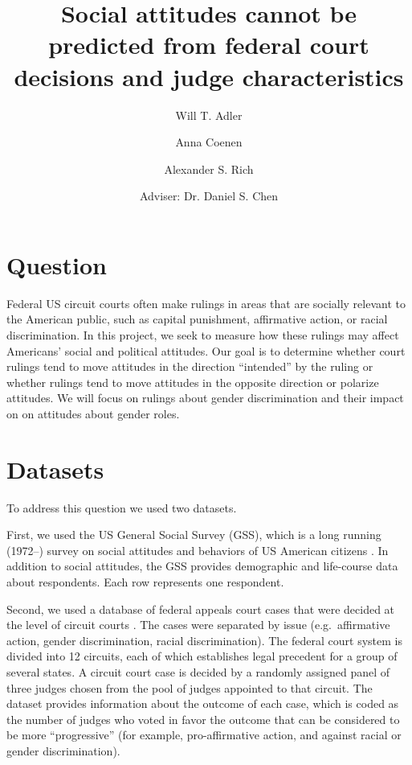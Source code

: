 \documentclass{article}
\begin{document}
\title{Social attitudes cannot be predicted from federal court decisions and
judge characteristics}


\author[ ]{Will T. Adler}
\author[ ]{Anna Coenen}
\author[ ]{Alexander S. Rich}
\author[ ]{Adviser: Dr. Daniel S. Chen}


\affil[ ]{}
\vspace{-1em}


\date{}


\begingroup
\let\center\flushleft
\let\endcenter\endflushleft
\maketitle
\endgroup




\section{Question}\label{question}

Federal US circuit courts often make rulings in areas that are socially
relevant to the American public, such as capital punishment, affirmative
action, or racial discrimination. In this project, we seek to measure
how these rulings may affect Americans' social and political attitudes.
Our goal is to determine whether court rulings tend to move attitudes in
the direction ``intended'' by the ruling or whether rulings tend to move
attitudes in the opposite direction or polarize attitudes. We will focus
on rulings about gender discrimination and their impact on on attitudes
about gender roles.

\section{Datasets}\label{datasets}

To address this question we used two datasets.

First, we used the US General Social Survey (GSS), which is a long
running (1972--) survey on social attitudes and behaviors of US American
citizens \citep{smith2013general}. In addition to social attitudes, the
GSS provides demographic and life-course data about respondents. Each
row represents one respondent.

Second, we used a database of federal appeals court cases that were
decided at the level of circuit courts \citep{sunstein2007judges}. The
cases were separated by issue (e.g.~affirmative action, gender
discrimination, racial discrimination). The federal court system is
divided into 12 circuits, each of which establishes legal precedent for
a group of several states. A circuit court case is decided by a randomly
assigned panel of three judges chosen from the pool of judges appointed
to that circuit. The dataset provides information about the outcome of
each case, which is coded as the number of judges who voted in favor the
outcome that can be considered to be more ``progressive'' (for example,
pro-affirmative action, and against racial or gender discrimination).
\end{document}

